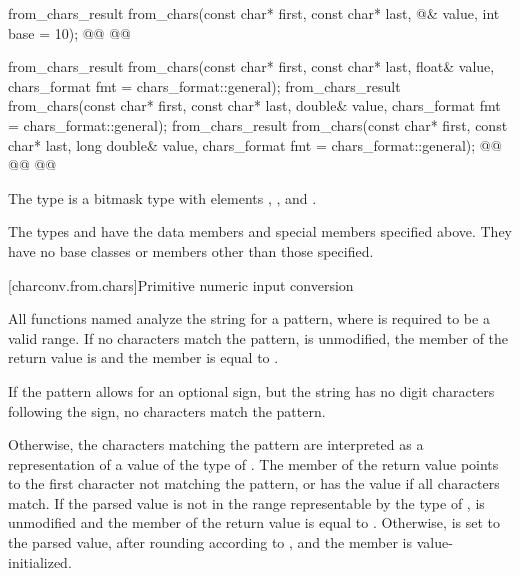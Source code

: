 \documentclass{wg21}
\begin{document}
\begin{codeblock}
{    from_chars_result from_chars(const char* first, const char* last,
    @\seebelow@& value, int base = 10);
    @@
    @@

    from_chars_result from_chars(const char* first, const char* last, float& value,
    chars_format fmt = chars_format::general);
    from_chars_result from_chars(const char* first, const char* last, double& value,
    chars_format fmt = chars_format::general);
    from_chars_result from_chars(const char* first, const char* last, long double& value,
    chars_format fmt = chars_format::general);
    @@
    @@
                                          @@
}
\end{codeblock}

\pnum
The type  is a bitmask type
with elements , , and .

\pnum
The types and 
have the data members and special members specified above.
They have no base classes or members other than those specified.

[charconv.from.chars]{Primitive numeric input conversion}

\pnum
All functions named 
analyze the string 
for a pattern,
where  is required to be a valid range.
If no characters match the pattern,
 is unmodified,
the member  of the return value is  and
the member  is equal to .
\begin{note}
    If the pattern allows for an optional sign,
    but the string has no digit characters following the sign,
    no characters match the pattern.
\end{note}
Otherwise,
the characters matching the pattern
are interpreted as a representation
of a value of the type of .
The member 
of the return value
points to the first character
not matching the pattern,
or has the value 
if all characters match.
If the parsed value
is not in the range
representable by the type of ,
 is unmodified and
the member  of the return value
is equal to .
Otherwise,
 is set to the parsed value,
after rounding according to , and
the member  is value-initialized.
\end{document}

